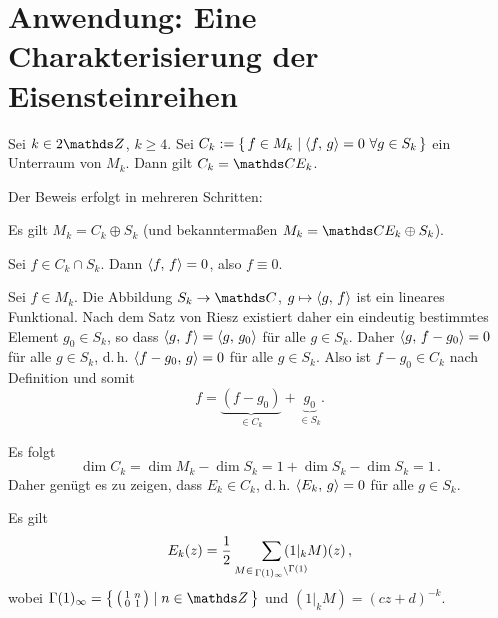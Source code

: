 \section{Anwendung: Eine Charakterisierung der Eisensteinreihen}

\begin{satz}\label{CharEk}
	Sei $k \in 2\ZZ$, $k \geq 4$. Sei $C_k := \Set{f \in M_k \mid \scalarprd{f}{g} = 0 \ \forall g \in S_k}$ ein Unterraum von $M_k$.
	Dann gilt $C_k = \CC E_k$.
\end{satz}


\begin{bewe}

	Der Beweis erfolgt in mehreren Schritten:
	\vspace{-2em}

\begin{lemm}
	Es gilt $M_k = C_k \oplus S_k$ (und bekanntermaßen $M_k = \CC E_k \oplus S_k$).
\end{lemm}

\begin{bewe}
	Sei $f \in C_k \cap S_k$. Dann $\scalarprd ff = 0$, also $f \equiv 0$.
	
	Sei $f \in M_k$.
	Die Abbildung $S_k \ra \CC$, $g \mapsto \scalarprd gf$ ist ein lineares Funktional.
	Nach dem Satz von Riesz existiert daher ein eindeutig bestimmtes Element $g_0 \in S_k$, so dass $\scalarprd gf = \scalarprd g{g_0}$ für alle $g \in S_k$.
	Daher $\scalarprd g{f-g_0} = 0$ für alle $g\in S_k$, d.\,h. $\scalarprd {f-g_0}g = 0$ für alle $g \in S_k$.
	Also ist $f-g_0 \in C_k$ nach Definition und somit
	\[
		f = \underbrace{(f-g_0)}_{\in C_k} + \underbrace{g_0}_{\in S_k} .
	\]
\end{bewe}

Es folgt
\[
	\dim C_k = \dim M_k - \dim S_k = 1 + \dim S_k - \dim S_k = 1\,.
\]
Daher genügt es zu zeigen, dass $E_k \in C_k$, d.\,h. $\scalarprd{E_k}g = 0$ für alle $g \in S_k$.

\begin{lemm}\label{Ek_per_Gamma(1)infty}
	Es gilt
	\[
		E_k(z) = \frac{1}{2} \smashoperator[r]{\sum_{M \in \linksmodulo{\Gamma(1)_\infty}{\Gamma(1)}}} \, (1|_k M)(z)\,,
	\]
	wobei $\Gamma(1)_\infty = \Set{\mymat 1n01 \mid n \in \ZZ}$ und $(1|_k M) = (cz+d)^{-k}$.
\end{lemm}


\end{bewe}
